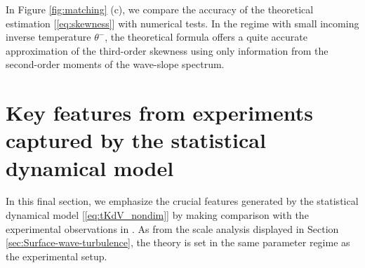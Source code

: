 \documentclass[9pt,twocolumn,twoside,lineno]{pnas-new}
\begin{document}
In Figure \ref{fig:matching} (c), we compare the accuracy of the
theoretical estimation [\ref{eq:skewness}] with numerical tests.
In the regime with small incoming inverse temperature $\theta^{-}$,
the theoretical formula offers a quite accurate approximation of the
third-order skewness using only information from the second-order
moments of the wave-slope spectrum. 

\section{Key features from experiments captured by the statistical dynamical model}

In this final section, we emphasize the crucial features generated
by the statistical dynamical model [\ref{eq:tKdV_nondim}] by making
comparison with the experimental observations in \cite{bolles2018anomalous}.
As from the scale analysis displayed in Section \ref{sec:Surface-wave-turbulence},
the theory is set in the same parameter regime as the experimental
setup.
\end{document}

